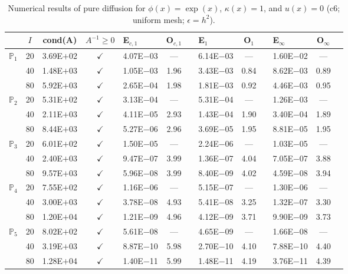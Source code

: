 \begin{table}[H]
\centering
\caption{Numerical results of pure diffusion for $\phi(x)=\exp(x)$, $\kappa(x)=1$, and $u(x)=0$ (c6; uniform mesh; $\epsilon=h^2$).}
\begin{tabular}{@{}l c c c l c c l c c l c c@{}}
\toprule
 & $I$ & cond(A) & $A^{-1}\geq 0$ &  E$_{c,1}$ & O$_{c,1}$ && E$_1$ & O$_1$ && E$_{\infty}$ & O$_{\infty}$\\
\midrule
\multirow{3}{*}{$\mathbb{P}_{1}$}
 & 20 & 3.69E$+$02 & $\checkmark$ & 4.07E$-$03 & --- && 6.14E$-$03 & --- && 1.60E$-$02 & ---\\
 & 40 & 1.48E$+$03 & $\checkmark$ & 1.05E$-$03 & 1.96 && 3.43E$-$03 & 0.84 && 8.62E$-$03 & 0.89\\
 & 80 & 5.92E$+$03 & $\checkmark$ & 2.65E$-$04 & 1.98 && 1.81E$-$03 & 0.92 && 4.46E$-$03 & 0.95\\
\midrule
\multirow{3}{*}{$\mathbb{P}_{2}$}
 & 20 & 5.31E$+$02 & $\checkmark$ & 3.13E$-$04 & --- && 5.31E$-$04 & --- && 1.26E$-$03 & ---\\
 & 40 & 2.11E$+$03 & $\checkmark$ & 4.11E$-$05 & 2.93 && 1.43E$-$04 & 1.90 && 3.40E$-$04 & 1.89\\
 & 80 & 8.44E$+$03 & $\checkmark$ & 5.27E$-$06 & 2.96 && 3.69E$-$05 & 1.95 && 8.81E$-$05 & 1.95\\
\midrule
\multirow{3}{*}{$\mathbb{P}_{3}$}
 & 20 & 6.01E$+$02 & $\checkmark$ & 1.50E$-$05 & --- && 2.24E$-$06 & --- && 1.03E$-$05 & ---\\
 & 40 & 2.40E$+$03 & $\checkmark$ & 9.47E$-$07 & 3.99 && 1.36E$-$07 & 4.04 && 7.05E$-$07 & 3.88\\
 & 80 & 9.57E$+$03 & $\checkmark$ & 5.96E$-$08 & 3.99 && 8.40E$-$09 & 4.02 && 4.59E$-$08 & 3.94\\
\midrule
\multirow{3}{*}{$\mathbb{P}_{4}$}
 & 20 & 7.55E$+$02 & $\checkmark$ & 1.16E$-$06 & --- && 5.15E$-$07 & --- && 1.30E$-$06 & ---\\
 & 40 & 3.00E$+$03 & $\checkmark$ & 3.78E$-$08 & 4.93 && 5.41E$-$08 & 3.25 && 1.32E$-$07 & 3.30\\
 & 80 & 1.20E$+$04 & $\checkmark$ & 1.21E$-$09 & 4.96 && 4.12E$-$09 & 3.71 && 9.90E$-$09 & 3.73\\
\midrule
\multirow{3}{*}{$\mathbb{P}_{5}$}
 & 20 & 8.02E$+$02 & $\checkmark$ & 5.61E$-$08 & --- && 4.65E$-$09 & --- && 1.66E$-$08 & ---\\
 & 40 & 3.19E$+$03 & $\checkmark$ & 8.87E$-$10 & 5.98 && 2.70E$-$10 & 4.10 && 7.88E$-$10 & 4.40\\
 & 80 & 1.28E$+$04 & $\checkmark$ & 1.40E$-$11 & 5.99 && 1.48E$-$11 & 4.19 && 3.76E$-$11 & 4.39\\
\bottomrule
\end{tabular}
\end{table}